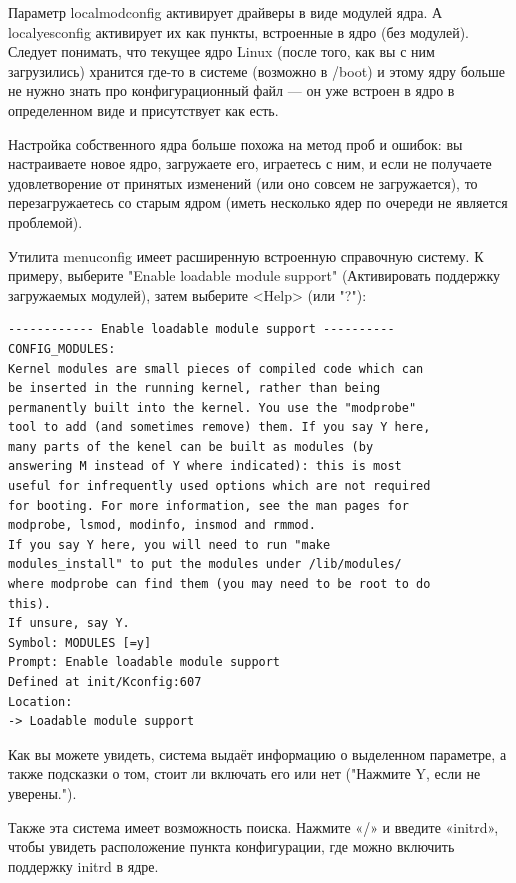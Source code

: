 \documentclass[10pt]{book}
\begin{document}
Параметр localmodconfig активирует драйверы в виде модулей ядра. А localyesconfig активирует их как пункты, встроенные в ядро (без модулей).
Следует понимать, что текущее ядро Linux (после того, как вы с ним загрузились) хранится где-то в системе (возможно в /boot) и этому ядру больше не нужно знать про конфигурационный файл — он уже встроен в ядро в определенном виде и присутствует как есть. 

Настройка собственного ядра больше похожа на метод проб и ошибок: вы настраиваете новое ядро, загружаете его, играетесь с ним,  и если не получаете удовлетворение от принятых изменений (или оно совсем не загружается), то перезагружаетесь со старым ядром (иметь несколько ядер по очереди не является проблемой).

Утилита menuconfig имеет расширенную встроенную справочную систему. К примеру, выберите "Enable loadable module support" (Активировать поддержку загружаемых модулей), затем выберите <Help> (или "?"):

\vspace{3mm}
\begin{tcolorbox}[colback=gray!14!white, colframe=blue!75!blue]
\begin{lstlisting}
------------ Enable loadable module support ----------
CONFIG_MODULES:
Kernel modules are small pieces of compiled code which can
be inserted in the running kernel, rather than being
permanently built into the kernel. You use the "modprobe"
tool to add (and sometimes remove) them. If you say Y here,
many parts of the kenel can be built as modules (by
answering M instead of Y where indicated): this is most
useful for infrequently used options which are not required
for booting. For more information, see the man pages for
modprobe, lsmod, modinfo, insmod and rmmod.
If you say Y here, you will need to run "make
modules_install" to put the modules under /lib/modules/
where modprobe can find them (you may need to be root to do
this).
If unsure, say Y.
Symbol: MODULES [=y]
Prompt: Enable loadable module support
Defined at init/Kconfig:607
Location:
-> Loadable module support
\end{lstlisting}
\end{tcolorbox}

Как вы можете увидеть, система выдаёт информацию о выделенном параметре, а также подсказки о том, стоит ли включать его или нет ("Нажмите Y, если не уверены.").

Также эта система имеет возможность поиска. Нажмите «/» и введите «initrd», чтобы увидеть расположение пункта конфигурации, где можно включить поддержку initrd в ядре.
\end{document}
